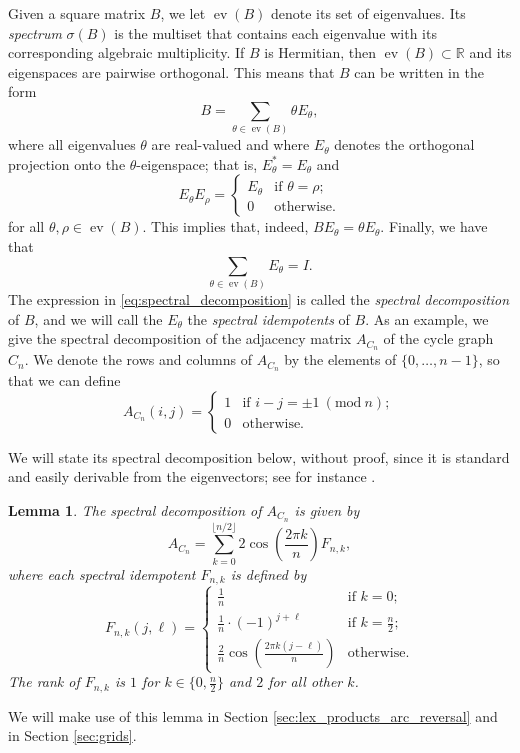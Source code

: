 \documentclass{article}
\newtheorem{lemma}[theorem]{Lemma}
\numberwithin{equation}{section}
\DeclareMathOperator\ev{ev}
\newcommand\re{{\mathbb R}}%
\newcommand{\slimmod}[1]{\ (\mathrm{mod}\ #1)}
\begin{document}
Given a square matrix $B$, we let $\ev(B)$ denote its set of eigenvalues. Its \textsl{spectrum} $\sigma(B)$ is the multiset that contains each eigenvalue with its corresponding algebraic multiplicity. If $B$ is Hermitian, then $\ev(B) \subset \re$ and its eigenspaces are pairwise orthogonal. This means that $B$ can be written in the form
\begin{equation}
\label{eq:spectral_decomposition}
B = \sum_{\theta \in \ev(B)} \theta E_\theta,
\end{equation}
where all eigenvalues $\theta$ are real-valued and where $E_\theta$ denotes the orthogonal projection onto the $\theta$-eigenspace; that is, $E_\theta^* = E_\theta$ and
\[
E_\theta E_\rho = \begin{cases}
E_\theta &\text{if $\theta = \rho$}; \\
0 & \text{otherwise.}
\end{cases}
\]
for all $\theta,\rho \in \ev(B)$. This implies that, indeed, $BE_\theta = \theta E_\theta$. Finally, we have that
\[
\sum_{\theta \in \ev(B)} E_\theta = I.
\]
The expression in \eqref{eq:spectral_decomposition} is called the \textsl{spectral decomposition} of $B$, and we will call the $E_\theta$ the \textsl{spectral idempotents} of $B$. As an example, we give the spectral decomposition of the adjacency matrix $A_{C_n}$ of the cycle graph $C_n$. We denote the rows and columns of $A_{C_n}$ by the elements of $\{0,\ldots,n-1\}$, so that we can define
\[
A_{C_n}(i,j) = 
\begin{cases}
    1 &\text{if $i - j = \pm 1 \slimmod n$}; \\
    0 &\text{otherwise.}
\end{cases}
\]

We will state its spectral decomposition below, without proof, since it is standard and easily derivable from the eigenvectors; see for instance \cite{Dav1979}.
\begin{lemma}
\label{lem:cycle_eigenvectors}
The spectral decomposition of $A_{C_n}$ is given by
\[
A_{C_n} = \sum_{k=0}^{\lfloor n/2 \rfloor} 2\cos\left(\frac{2\pi k}{n}\right) F_{n,k},
\]
where each spectral idempotent $F_{n,k}$ is defined by
\begin{equation}
\label{eq:cycle_idempotent_entries}
F_{n,k}(j,\ell) = \begin{cases}
\frac{1}{n} &\text{if $k = 0$;} \\
\frac{1}{n} \cdot (-1)^{j + \ell} &\text{if $k = \frac{n}{2}$;} \\
\frac{2}{n}\cos\left(\frac{2\pi k(j-\ell)}{n}\right) &\text{otherwise.}
\end{cases}
\end{equation}
The rank of $F_{n,k}$ is $1$ for $k \in \{0,\frac{n}{2}\}$ and $2$ for all other $k$. \qedhere 
\end{lemma}
\noindent We will make use of this lemma in Section \ref{sec:lex_products_arc_reversal} and in Section \ref{sec:grids}.
\end{document}
